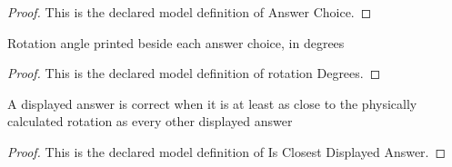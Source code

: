 \begin{proof}
  This is the declared model definition of Answer Choice.
\end{proof}
\begin{definition}
  \label{def:physics:phyx-mini-0011:phyxminiproblems-problemphyxmini0011-answerchoice-rotationdegrees}
  Rotation angle printed beside each answer choice, in degrees
\end{definition}
\begin{proof}
  This is the declared model definition of rotation Degrees.
\end{proof}
\begin{definition}
  \label{def:physics:phyx-mini-0011:phyxminiproblems-problemphyxmini0011-isclosestdisplayedanswer}
  A displayed answer is correct when it is at least as close to the physically calculated rotation as every other displayed answer
\end{definition}
\begin{proof}
  This is the declared model definition of Is Closest Displayed Answer.
\end{proof}
